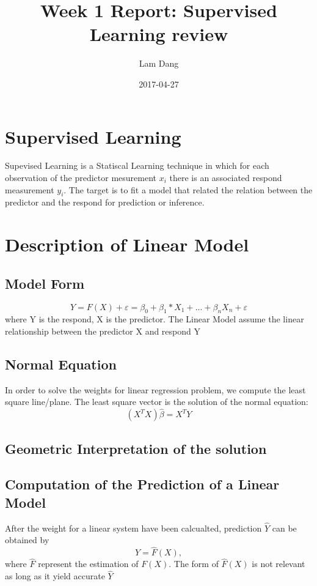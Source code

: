 \documentclass{article}
\title{Week 1 Report: Supervised Learning review}
\date{2017-04-27}
\author{Lam Dang}
\begin{document}
\maketitle
\newpage
{}

\section{Supervised Learning}
Supevised Learning is a Statiscal Learning technique in which for each observation of the predictor mesurement $x_i$ there is an associated respond measurement $y_i$. The target is to fit a model that related the relation between the predictor and the respond for prediction or inference.
\section{Description of Linear Model}
\subsection{Model Form}
\begin{equation*}
Y=F(X)+\varepsilon=\beta_0 + \beta_1*X_1 + ... + \beta_n X_n + \varepsilon
\end{equation*}
where Y is the respond, X is the predictor. The Linear Model assume the linear relationship between the predictor X and respond Y
\subsection{Normal Equation}
In order to solve the weights for linear regression problem, we compute the least square line/plane. The least square vector is the solution of the normal equation:
\begin{equation*}
(X^TX)\hat{\beta} = X^TY
\end{equation*}
\subsection{Geometric Interpretation of the solution}

\subsection{Computation of the Prediction of a Linear Model}
After the weight for a linear system have been calcualted, prediction $\hat{Y}$ can be obtained by
\begin{equation*}
\hat{Y} = \hat{F}(X),
\end{equation*}
where $\hat{F}$ represent the estimation of $F(X)$. The form of $\hat{F}(X)$ is not relevant as long as it yield accurate $\hat{Y}$
\end{document}
